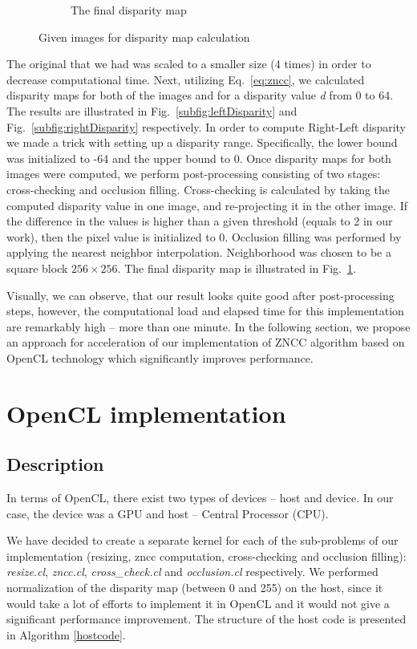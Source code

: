 \documentclass[conference]{IEEEtran}
\begin{document}
\begin{figure}[t!]
\begin{subfigure}{\linewidth}
 		\caption{The final disparity map}\label{subfig:finalDisparity}
	\end{subfigure}
\caption{Given images for disparity map calculation}\label{fig:disparities}
\end{figure}

The original that we had was scaled to a smaller size (4 times) in order to decrease computational time. Next, utilizing Eq.~\ref{eq:zncc}, we calculated disparity maps for both of the images and for a disparity value \textit{d} from 0 to 64. The results are illustrated in Fig.~\ref{subfig:leftDisparity} and Fig.~\ref{subfig:rightDisparity} respectively. In order to compute Right-Left disparity we made a trick with setting up a disparity range. Specifically, the lower bound was initialized to -64 and the upper bound to 0. Once disparity maps for both images were computed, we perform post-processing consisting of two stages: cross-checking and occlusion filling. Cross-checking is calculated by taking the computed disparity value in one image, and re-projecting it in the other image. If the difference in the values is higher than a given threshold (equals to 2 in our work), then the pixel value is initialized to 0. Occlusion filling was performed by applying the nearest neighbor interpolation. Neighborhood was chosen to be a square block $256\times256$. The final disparity map is illustrated in Fig.~\ref{subfig:finalDisparity}. 

Visually, we can observe, that our result looks quite good after post-processing steps, however, the computational load and elapsed time for this implementation are remarkably high -- more than one minute. In the following section, we propose an approach for acceleration of our implementation of ZNCC algorithm based on OpenCL technology which significantly improves performance.

\section{OpenCL implementation}\label{sec:OpenclImplementation}
\subsection{Description}
In terms of OpenCL, there exist two types of devices -- host and device. In our case, the device was a GPU and host -- Central Processor (CPU).

We have decided to create a separate kernel for each of the sub-problems of our implementation (resizing, zncc computation, cross-checking and occlusion filling): \textit{resize.cl}, \textit{zncc.cl}, \textit{cross\_check.cl} and \textit{occlusion.cl} respectively. We performed normalization of the disparity map (between 0 and 255) on the host, since it would take a lot of efforts to implement it in OpenCL and it would not give a significant performance improvement. The structure of the host code is presented in Algorithm \ref{hostcode}.
\end{document}
